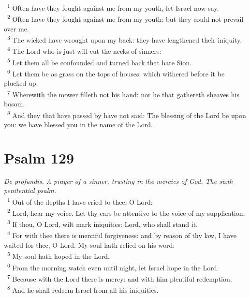 \documentclass[a5paper,12pt]{article}
\begin{document}
\begin{multicols*}{2}
~\textsuperscript{1} Often have they fought against me from my youth, let Israel now say.\\
~\textsuperscript{2} Often have they fought against me from my youth: but they could not prevail over me.\\
~\textsuperscript{3} The wicked have wrought upon my back: they have lengthened their iniquity.\\
~\textsuperscript{4} The Lord who is just will cut the necks of sinners:\\
~\textsuperscript{5} Let them all be confounded and turned back that hate Sion.\\
~\textsuperscript{6} Let them be as grass on the tops of houses: which withered before it be plucked up:\\
~\textsuperscript{7} Wherewith the mower filleth not his hand: nor he that gathereth sheaves his bosom.\\
~\textsuperscript{8} And they that have passed by have not said: The blessing of the Lord be upon you: we have blessed you in the name of the Lord.\\

\section{Psalm 129}
\label{sec:org5bf7550}
\emph{De profundis. A prayer of a sinner, trusting in the mercies of God. The sixth penitential psalm.}\\

~\textsuperscript{1} Out of the depths I have cried to thee, O Lord:\\
~\textsuperscript{2} Lord, hear my voice. Let thy ears be attentive to the voice of my supplication.\\
~\textsuperscript{3} If thou, O Lord, wilt mark iniquities: Lord, who shall stand it.\\
~\textsuperscript{4} For with thee there is merciful forgiveness: and by reason of thy law, I have waited for thee, O Lord. My soul hath relied on his word:\\
~\textsuperscript{5} My soul hath hoped in the Lord.\\
~\textsuperscript{6} From the morning watch even until night, let Israel hope in the Lord.\\
~\textsuperscript{7} Because with the Lord there is mercy: and with him plentiful redemption.\\
~\textsuperscript{8} And he shall redeem Israel from all his iniquities.\\


\end{multicols*}
\end{document}
